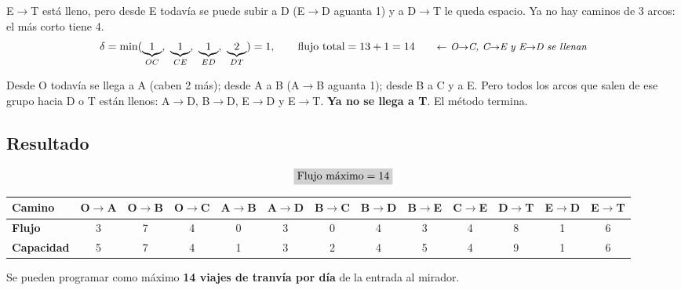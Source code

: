 \documentclass[11pt,a4paper]{article}
\newcommand{\ar}[4][arco]{\draw[#1] (#2) to node[etq, lbl] {#4} (#3);}
\newcommand{\nodosSeervada}{%
  \node[fuente]   (O) at (0,-2)     {O};
  \node[nodo]     (A) at (1.5,-0.6) {A};
  \node[nodo]     (B) at (2,-2)     {B};
  \node[nodo]     (C) at (1.5,-3.4) {C};
  \node[nodo]     (D) at (3.6,-0.9) {D};
  \node[nodo]     (E) at (3.6,-3.1) {E};
  \node[sumidero] (T) at (5,-2)     {T};}
\begin{document}
E$\to$T está lleno, pero desde E todavía se puede subir a D (E$\to$D aguanta 1) y a D$\to$T le queda espacio.
Ya no hay caminos de 3 arcos: el más corto tiene 4.
\[
\delta = \min(\underbrace{1}_{OC},\ \underbrace{1}_{CE},\ \underbrace{1}_{ED},\ \underbrace{2}_{DT}) = 1,
\qquad \text{flujo total} = 13 + 1 = 14 \nota{O$\to$C, C$\to$E y E$\to$D se llenan}
\]

\begin{center}
\hfill
{}
\end{center}

Desde O todavía se llega a A (caben 2 más); desde A a B (A$\to$B aguanta 1); desde B a C y a E. Pero todos los
arcos que salen de ese grupo hacia D o T están llenos: A$\to$D, B$\to$D, E$\to$D y E$\to$T. \textbf{Ya no se llega
a T}. El método termina.

\subsection*{Resultado}
\[
\res{\text{Flujo máximo} = 14}
\]
\begin{center}\small
\setlength{\tabcolsep}{4.5pt}
\begin{tabular}{lcccccccccccc}
\toprule
\textbf{Camino} & O$\to$A & O$\to$B & O$\to$C & A$\to$B & A$\to$D & B$\to$C & B$\to$D & B$\to$E & C$\to$E & D$\to$T & E$\to$D & E$\to$T \\
\midrule
\textbf{Flujo} & 3 & 7 & 4 & 0 & 3 & 0 & 4 & 3 & 4 & 8 & 1 & 6 \\
\textbf{Capacidad} & 5 & 7 & 4 & 1 & 3 & 2 & 4 & 5 & 4 & 9 & 1 & 6 \\
\bottomrule
\end{tabular}
\end{center}
Se pueden programar como máximo \textbf{14 viajes de tranvía por día} de la entrada al mirador.
\end{document}
